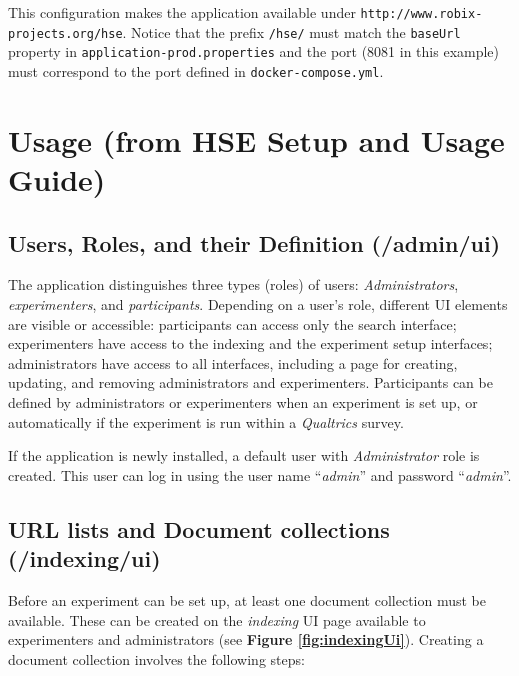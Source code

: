\documentclass[a4paper]{usiinfbachelorproject}
\begin{document}
\begin{appendices}
        This configuration makes the application available under \texttt{http://www.robix-projects.org/hse}. Notice that
        the prefix \texttt{/hse/} must match the \texttt{baseUrl} property in \texttt{application-prod.properties}
        and the port (8081 in this example) must correspond to the port defined in \texttt{docker-compose.yml}. 

        \section{Usage (from HSE Setup and Usage Guide)}
        \label{sec:usage}


        \subsection{Users, Roles, and their Definition \small{(/admin/ui)}}

        The application distinguishes three types (roles) of users: \emph{Administrators}, \emph{experimenters}, and \emph{participants}.
        Depending on a user's role, different UI elements are visible or accessible: participants can access only the search interface; 
        experimenters have access to the indexing and the experiment setup interfaces; administrators have access to all interfaces,
        including a page for creating, updating, and removing administrators and experimenters. Participants can be defined
        by administrators or experimenters when an experiment is set up, or automatically if the experiment is run within
        a \emph{Qualtrics} survey.

        If the application is newly installed, a default user with \emph{Administrator} role is created. This user can log in using
        the user name ``\emph{admin}'' and password ``\emph{admin}''.

        \subsection{URL lists and Document collections \small{(/indexing/ui)}}

        Before an experiment can be set up, at least one document collection must be available. These can be created on the \emph{indexing}
        UI page available to experimenters and administrators (see \textbf{Figure \ref{fig:indexingUi}}). Creating a document collection involves
        the following steps:
        \begin{itemize}


\end{itemize}
\end{appendices}
\end{document}
